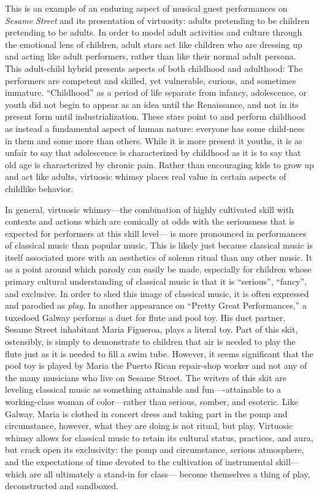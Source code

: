 \documentclass[12pt,letterpaper]{article}
\begin{document}
	This is an example of an enduring aspect of musical guest performances
	on \textit{Sesame Street} and its presentation of virtuosity: adults 
	pretending to be children pretending
	to be adults. In order to model adult activities and culture through the
	emotional lens of children, adult stars act like children who are 
	dressing up and acting like adult performers, rather than like their
	normal adult persona. This adult-child hybrid 
	presents aspects of both childhood and adulthood: The performers are 
	competent and skilled, yet vulnerable, curious, and sometimes immature.  
	``Childhood'' as a period of life separate from infancy, adolescence, 
	or youth did not begin to appear as an idea until the Renaissance, and
	not in its present form until industrialization.\autocite[13]{Illich}
	These stars point to and perform childhood as instead a fundamental 
	aspect of human nature: everyone has some child-ness in them and some
	more than others. While it is more present it youths, it is as unfair
	to say that adolescence is characterized by childhood as it is to say
	that old age is characterized by chronic pain. Rather than encouraging
	kids to grow up and act like adults, virtuosic whimsy places real value
	in certain aspects of childlike behavior.

	In general, virtuosic whimsy---the combination of highly cultivated
	skill with contexts and actions which are comically at odds with the
	seriousness that is expected for performers at this skill level--- is 
	more pronounced in performances	of classical music than popular music.
	This is likely just because classical music is itself associated more
	with an aesthetics of solemn ritual than any other music. It as a point
	around which parody can easily be made, especially for children whose
	primary cultural understanding of classical music is that it is 
	``serious'', ``fancy'', and 
	exclusive. In order to shed this image of classical music, it is often 
	expressed and parodied as \textit{play}. In another appearance on 
	``Pretty Great Performances,'' a tuxedoed Galway performs a duet for 
	flute and pool toy.\autocite{Galway1} His duet partner, Sesame 
	Street inhabitant Maria Figueroa,\autocite{Maria} plays a literal toy. 
	Part of this skit, ostensibly, is simply to demonstrate to children that
	air is needed to play the flute just as it is needed to fill a swim 
	tube. However, it seems significant that the pool toy is played by Maria
	the Puerto Rican repair-shop worker and not any of the many musicians 
	who live on Sesame Street. The writers of this skit are leveling 
	classical music as something attainable and fun----attainable to a 
	working-class woman of color---rather than serious, somber, and 
	esoteric. Like Galway, Maria is clothed in concert dress and taking part
	in the pomp and circumstance, however, what they are doing is not 
	ritual, but play. Virtuosic whimsy allows for classical music to retain 
	its cultural status, practices, and aura, but crack open its 
	exclusivity: the pomp and circumstance, serious atmosphere, 
	and the expectations of time devoted to the cultivation of instrumental
	skill---which are all ultimately a stand-in for 
	class---\autocite[7]{Bull} become themselves a thing of play, 
	deconstructed and sandboxed. 
\end{document}
